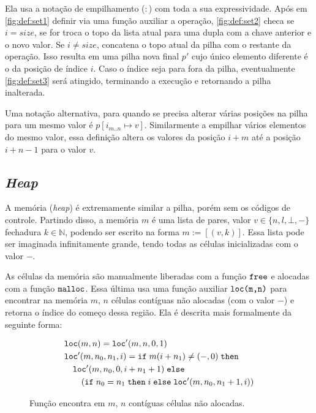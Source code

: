Ela usa a notação de empilhamento ($:$) com toda a sua expressividade. Após em \ref{fig:def:set1} definir via uma função auxiliar a operação, \ref{fig:def:set2} checa se $i = size$, se for troca o topo da lista atual para uma dupla com a chave anterior e o novo valor. Se $i \neq size$, concatena o topo atual da pilha com o restante da operação. Isso resulta em uma pilha nova final $p'$ cujo único elemento diferente é o da posição de índice $i$. Caso o índice seja para fora da pilha, eventualmente \ref{fig:def:set3} será atingido, terminando a execução e retornando a pilha inalterada.

Uma notação alternativa, para quando se precisa alterar várias posições na pilha para um mesmo valor é $p[i_{m..n} \mapsto v]$. Similarmente a empilhar vários elementos do mesmo valor, essa definição altera os valores da posição $i + m$ até a posição $i + n - 1$ para o valor $v$.


\subsection{\emph{Heap}}
\label{sec:pcl-back:mem}

A memória (\emph{heap}) é extremamente similar a pilha, porém sem os códigos de controle. Partindo disso, a memória $m$ é uma lista de pares, valor $v \in \{n, l, \bot, -\}$ fechadura $k \in \mathbb{N}$, podendo ser escrito na forma $m := [(v, k)]$. Essa lista pode ser imaginada infinitamente grande, tendo todas as células inicializadas com o valor $-$.

As células da memória são manualmente liberadas com a função $\texttt{free}$ e alocadas com a função $\texttt{malloc}$. Essa última usa uma função auxiliar $\texttt{loc(m,n)}$ para encontrar na memória $m$, $n$ células contíguas não alocadas (com o valor $-$) e retorna o índice do começo dessa região. Ela é descrita mais formalmente da seguinte forma:

\begin{figure}[ht]
	\begin{align}
	&\texttt{loc}(m,n) = \texttt{loc}'(m, n, 0, 1) \label{fig:def:loc1}\\
	& \texttt{loc}'(m, n_0 , n_1, i) = \texttt{if}\; m(i + n_1) \neq (-,0) \; \texttt{then}\nonumber \\
	&\quad\texttt{loc}'(m, n_0, 0, i + n_1 + 1)\; \texttt{else} \nonumber\\
	&\quad\quad(\texttt{if}\; n_0 = n_1 \; \texttt{then}\; i \;\texttt{else}\; \texttt{loc}'(m, n_0, n_1 + 1, i)) \label{fig:def:loc2}
	\end{align}
	\caption{Função encontra em $m$, $n$ contíguas células não alocadas.}
	\label{fig:def:loc}
\end{figure}

